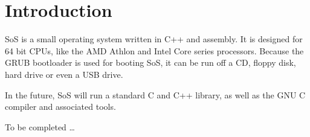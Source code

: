 \section{Introduction}
SoS is a small operating system written in C++ and assembly. It is designed for 64 bit CPUs, like the
AMD Athlon and Intel Core series processors. Because the GRUB bootloader is used for booting SoS, it
can be run off a CD, floppy disk, hard drive or even a USB drive.

In the future, SoS will run a standard C and C++ library, as well as the GNU C compiler and associated
tools.

To be completed \ldots
